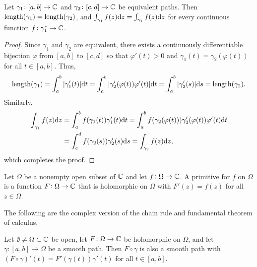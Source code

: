 \documentclass[11pt,a4paper]{article}
\begin{document}
\begin{proposition}
  Let $\gamma_1 \colon [a,b] \to \mathbb{C}$ and $\gamma_2 \colon [c,d] \to \mathbb{C}$
  be equivalent paths.
  Then $\mathrm{length}(\gamma_1) = \mathrm{length}(\gamma_2)$, and
  $\int_{\gamma_1} f(z) \mathrm{d} z = \int_{\gamma_1} f(z) \mathrm{d} z$ for every continuous
  function $f \colon \gamma_1^* \to \mathbb{C}$.
\end{proposition}
\begin{proof}
  Since $\gamma_1$ and $\gamma_2$ are equivalent,
  there exists a continuously differentiable bijection 
  $\varphi$ from $[a, b]$ to $[c, d]$ so
  that $\varphi'(t) > 0$ and $\gamma_1(t) = \gamma_2(\varphi(t))$
  for all $t \in [a, b]$. Thus,
  \[
    \mathrm{length}(\gamma_1) =
    \int_{a}^{b} |\gamma_1'(t)| \mathrm{d} t =
    \int_{a}^{b} |\gamma_2'(\varphi(t)) \varphi'(t)| \mathrm{d} t =
    \int_{a}^{b} |\gamma_2'(s)| \mathrm{d} s =
    \mathrm{length}(\gamma_2).
  \]
  Similarly,
  \begin{align*}
    \int_{\gamma_1} f(z) \mathrm{d} z &=
    \int_{a}^{b} f(\gamma_1(t)) \gamma_1'(t) \mathrm{d} t =
    \int_{a}^{b} f(\gamma_2(\varphi(t))) \gamma_2'(\varphi(t)) \varphi'(t) \mathrm{d} t
                          \\ &=
    \int_{c}^{d} f(\gamma_2(s)) \gamma_2'(s) \mathrm{d} s =
    \int_{\gamma_2} f(z) \mathrm{d} z,
  \end{align*}
  which completes the proof.
\end{proof}

\begin{definition}
  Let $\Omega$ be a nonempty open subset of $\mathbb{C}$ and let
  $f \colon \Omega \to \mathbb{C}$.
  A primitive for $f$ on $\Omega$ is a function $F \colon \Omega \to \mathbb{C}$
  that is holomorphic on $\Omega$ with $F'(z) = f(z)$ for all $z \in \Omega$.
\end{definition}

\begin{remark}
The following are the complex version of the chain rule and fundamental theorem
of calculus.
\end{remark}

\begin{lemma}
  Let $\emptyset \neq \Omega \subset \mathbb{C}$ be open,
  let $F \colon \Omega \to \mathbb{C}$ be holomorphic on $\Omega$,
  and let $\gamma \colon [a, b] \to \Omega$ be a smooth path.
  Then $F \circ \gamma$ is also a smooth path with
  $(F \circ \gamma)'(t) = F'(\gamma(t))\gamma'(t)$ for all $t \in [a, b]$.
\end{lemma}
\end{document}
